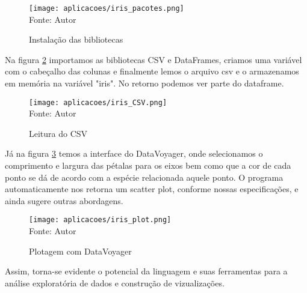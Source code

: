 \begin{figure}[H]
   \begin{center}
       \caption{Instalação das bibliotecas} \label{iris_pacotes}
       \texttt{[image: aplicacoes/iris\_pacotes.png]} \\
       {\tiny \sf Fonte: Autor}
   \end{center}
\end{figure}

Na figura \ref{iris_csv} importamos as bibliotecas CSV e DataFrames, criamos uma variável com o cabeçalho das colunas e finalmente lemos o arquivo csv e o armazenamos em memória na variável "iris". No retorno podemos ver parte do dataframe.

\begin{figure}[H]
   \begin{center}
       \caption{Leitura do CSV} \label{iris_csv}
       \texttt{[image: aplicacoes/iris\_CSV.png]} \\
       {\tiny \sf Fonte: Autor}
   \end{center}
\end{figure}

Já na figura \ref{iris_plot} temos a interface do DataVoyager, onde selecionamos o comprimento e largura das pétalas para os eixos bem como que a cor de cada ponto se dá de acordo com a espécie relacionada aquele ponto. O programa automaticamente nos retorna um scatter plot, conforme nossas especificações, e ainda sugere outras abordagens. 


\begin{figure}[H]
   \begin{center}
       \caption{Plotagem com DataVoyager} \label{iris_plot}
       \texttt{[image: aplicacoes/iris\_plot.png]} \\
       {\tiny \sf Fonte: Autor}
   \end{center}
\end{figure}

Assim, torna-se evidente o potencial da linguagem e suas ferramentas para a análise exploratória de dados e construção de vizualizações. 


